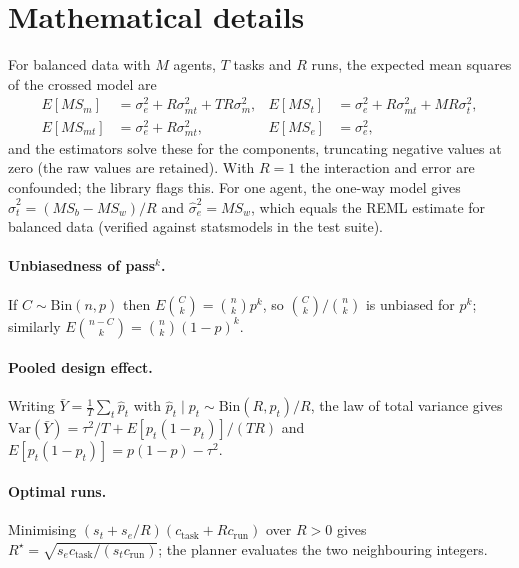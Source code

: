 \section{Mathematical details}\label{app:ems}
For balanced data with $M$ agents, $T$ tasks and $R$ runs, the expected mean squares of the crossed model are
\begin{align*}
E[MS_m]&=\sigma^2_e+R\sigma^2_{mt}+TR\sigma^2_m, & E[MS_t]&=\sigma^2_e+R\sigma^2_{mt}+MR\sigma^2_t,\\
E[MS_{mt}]&=\sigma^2_e+R\sigma^2_{mt}, & E[MS_e]&=\sigma^2_e,
\end{align*}
and the estimators solve these for the components, truncating negative values at zero (the raw values are retained). With $R=1$ the interaction and error are confounded; the library flags this. For one agent, the one-way model gives $\hat\sigma^2_t=(MS_b-MS_w)/R$ and $\hat\sigma^2_e=MS_w$, which equals the REML estimate for balanced data (verified against statsmodels in the test suite).

\paragraph{Unbiasedness of pass$^k$.} If $C\sim\mathrm{Bin}(n,p)$ then $E\binom{C}{k}=\binom{n}{k}p^k$, so $\binom{C}{k}/\binom{n}{k}$ is unbiased for $p^k$; similarly $E\binom{n-C}{k}=\binom{n}{k}(1-p)^k$.

\paragraph{Pooled design effect.} Writing $\bar Y=\frac1T\sum_t \hat p_t$ with $\hat p_t\mid p_t\sim\mathrm{Bin}(R,p_t)/R$, the law of total variance gives $\mathrm{Var}(\bar Y)=\tau^2/T+E[p_t(1-p_t)]/(TR)$ and $E[p_t(1-p_t)]=p(1-p)-\tau^2$.

\paragraph{Optimal runs.} Minimising $(s_t+s_e/R)(c_\text{task}+Rc_\text{run})$ over $R>0$ gives $R^\star=\sqrt{s_ec_\text{task}/(s_tc_\text{run})}$; the planner evaluates the two neighbouring integers.


